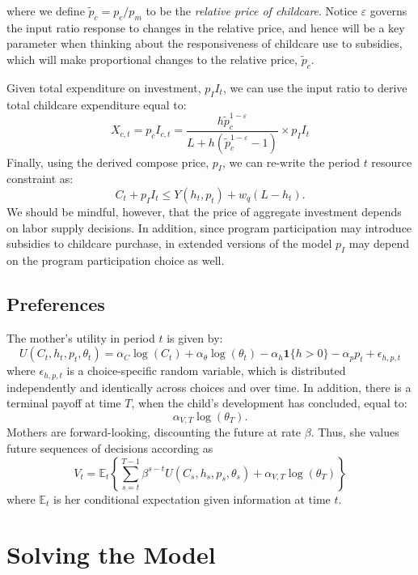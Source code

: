\documentclass[12pt]{article}
\newcommand\eps{\epsilon}
\numberwithin{equation}{section}
\numberwithin{figure}{section}
\numberwithin{table}{section}
\begin{document}
where we define $\tilde{p}_c=p_c/p_m$ to be the \emph{relative price of childcare}. Notice $\varepsilon$ governs the input ratio response to changes in the relative price, and hence will be a key parameter when thinking about the responsiveness of childcare use to subsidies, which will make proportional changes to the relative price, $\tilde{p}_c$.


Given total expenditure on investment, $p_II_t$, we can use the input ratio to derive total childcare expenditure equal to:
\[X_{c,t} = p_cI_{c,t} = \frac{h\tilde{p}_c^{1-\varepsilon}}{L + h(\tilde{p}_c^{1-\varepsilon}-1)}\times p_II_t \]
Finally, using the derived compose price, $p_I$, we can re-write the period $t$ resource constraint as:
\[ C_t + p_II_t \leq Y(h_t,p_t) + w_q(L-h_t) .\]
We should be mindful, however, that the price of aggregate investment depends on labor supply decisions. In addition, since program participation may introduce subsidies to childcare purchase, in extended versions of the model $p_I$ may depend on the program participation choice as well.

\subsection{Preferences}
The mother's utility in period $t$ is given by:
\[U(C_t,h_t,p_t,\theta_t) = \alpha_{C}\log(C_t) + \alpha_\theta\log(\theta_t) - \alpha_h\mathbf{1}\{h>0\} - \alpha_p p_t + \eps_{h,p,t}\]
where $\eps_{h,p,t}$ is a choice-specific random variable, which is distributed independently and identically across choices and over time. In addition, there is a terminal payoff at time $T$, when the child's development has concluded, equal to:
\[ \alpha_{V,T}\log(\theta_T) .\]
Mothers are forward-looking, discounting the future at rate $\beta$. Thus, she values future sequences of decisions according as
\[V_t = \mathbb{E}_t\left\{\sum_{s=t}^{T-1}\beta^{s-t}U(C_s,h_s,p_s,\theta_s) + \alpha_{V,T}\log(\theta_T)\right\} \]
where $\mathbb{E}_t$ is her conditional expectation given information at time $t$.

\section{Solving the Model}
\end{document}
